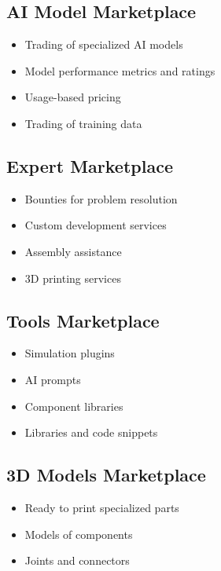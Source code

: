 \subsection{AI Model Marketplace}
\begin{itemize}[leftmargin=*]
    \item Trading of specialized AI models
    \item Model performance metrics and ratings
    \item Usage-based pricing
    \item Trading of training data
\end{itemize}

\subsection{Expert Marketplace}
\begin{itemize}[leftmargin=*]
    \item Bounties for problem resolution
    \item Custom development services
    \item Assembly assistance
    \item 3D printing services
\end{itemize}

\subsection{Tools Marketplace}
\begin{itemize}[leftmargin=*]
    \item Simulation plugins
    \item AI prompts
    \item Component libraries
    \item Libraries and code snippets
\end{itemize}

\subsection{3D Models Marketplace}
\begin{itemize}[leftmargin=*]
    \item Ready to print specialized parts
    \item Models of components
    \item Joints and connectors
\end{itemize}
